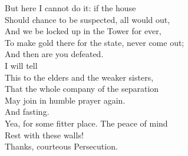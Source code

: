 \documentclass[a4paper,oneside,12pt]{memoir}
\begin{document}
\begin{drama*}
But here I cannot do it: if the house\\
Should chance to be suspected, all would out,\\
And we be locked up in the Tower for ever,\\
To make gold there for the state, never come out;\\
And then are you defeated.\\
\persecutionspeaks {} I will tell\\
This to the elders and the weaker sisters,\\
That the whole company of the separation\\
May join in humble prayer again.\\
\subtlespeaks {} And fasting.\\
\persecutionspeaks Yea, for some fitter place. The peace of mind\\
Rest with these walls!\\
\subtlespeaks {} Thanks, courteous Persecution.\\

\scene


\end{drama*}
\end{document}
